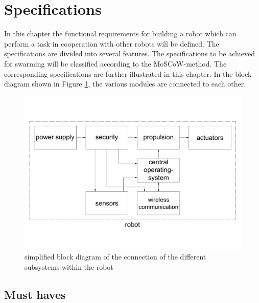 \documentclass[10pt,a4paper]{article}
\begin{document}
\section{Specifications}
In this chapter the functional requirements for building a robot which can perform a task in cooperation with other robots will be defined. The specifications are divided into several features. The specifications to be achieved for swarming will be classified according to the MoSCoW-method. The corresponding specifications are further illustrated in this chapter. In the block diagram shown in Figure  \ref{fig:blockschematic}, the various modules are connected to each other.



\begin{figure}[h]
    \centering
    \includegraphics[width=1\textwidth]{blockschematic}
    \caption{simplified block diagram of the connection of the different subsystems within the robot }
    \label{fig:blockschematic}
\end{figure}



\subsection{Must haves}
\end{document}

